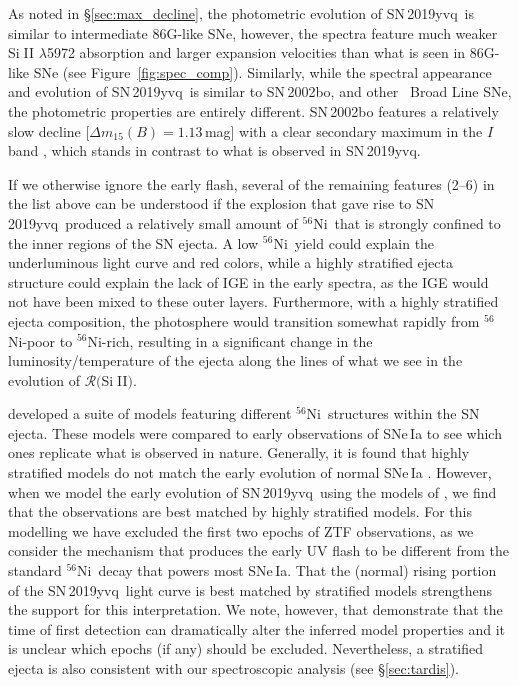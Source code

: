 \documentclass[twocolumn]{aastex63}
\def\ion#1#2{#1$\;${\footnotesize\rm{#2}}\relax}
\newcommand{\RSiII}{$\mathcal{R}($\ion{Si}{II}$)$}
\newcommand{\radni}{$^{56}$Ni}
\newcommand{\sn}{SN\,2019yvq}
\begin{document}
As noted in \S\ref{sec:max_decline}, the photometric evolution of \sn\ is
similar to intermediate 86G-like SNe, however, the spectra feature much weaker
\ion{Si}{II} $\lambda$5972 absorption and larger expansion velocities than
what is seen in 86G-like SNe (see Figure~\ref{fig:spec_comp}). Similarly,
while the spectral appearance and evolution of \sn\ is similar to SN\,2002bo,
and other \citeauthor{Branch06}~Broad Line SNe, the photometric properties are
entirely different. SN\,2002bo features a relatively slow decline
[$\Delta{m}_{15}(B) = 1.13$\,mag] with a clear secondary maximum in the $I$
band \citep{Benetti04}, which stands in contrast to what is observed in \sn.

If we otherwise ignore the early flash, several of the remaining features
(2--6) in the list above can be understood if the explosion that gave rise to
\sn\ produced a relatively small amount of \radni\ that is strongly confined
to the inner regions of the SN ejecta. A low \radni\ yield could explain the
underluminous light curve and red colors, while a highly stratified ejecta
structure could explain the lack of IGE in the early spectra, as the IGE would
not have been mixed to these outer layers. Furthermore, with a highly
stratified ejecta composition, the photosphere would transition somewhat
rapidly from \radni-poor to \radni-rich, resulting in a significant change in
the luminosity/temperature of the ejecta along the lines of what we see in the
evolution of \RSiII.

\citet{Magee20} developed a suite of models featuring different \radni\
structures within the SN ejecta. These models were compared to early
observations of SNe\,Ia to see which ones replicate what is observed in
nature. Generally, it is found that highly stratified models do not match the
early evolution of normal SNe\,Ia \citep{Magee20}. However, when we model the
early evolution of \sn\ using the models of \citet{Magee20}, we find that the
observations are best matched by highly stratified models. For this modelling
we have excluded the first two epochs of ZTF observations, as we consider the
mechanism that produces the early UV flash to be different from the standard
\radni\ decay that powers most SNe\,Ia. That the (normal) rising portion of
the \sn\ light curve is best matched by stratified models strengthens the
support for this interpretation. We note, however, that \citet{Magee20}
demonstrate that the time of first detection can dramatically alter the
inferred model properties and it is unclear which epochs (if any) should be
excluded. Nevertheless, a stratified ejecta is also consistent with our
spectroscopic analysis (see \S\ref{sec:tardis}).
\end{document}
